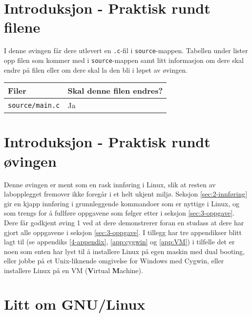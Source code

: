 \begin{alphasection}
\section{Introduksjon - Praktisk rundt filene}

I denne øvingen får dere utlevert en \verb|.c|-fil i \verb|source|-mappen. Tabellen under lister opp filen som kommer med i \verb|source|-mappen samt litt informasjon om dere skal endre på filen eller om dere skal la den bli i løpet av øvingen.

\begin{center}
 \begin{tabular}{|p{8.5cm} p{5.5cm}|} 
 \hline
 \textbf{Filer} & \textbf{Skal denne filen endres?}  \\ [0.5ex] 
 \hline\hline
  \verb|source/main.c| & Ja  \\ 
 \hline
\end{tabular}
\end{center}

\section{Introduksjon - Praktisk rundt øvingen}
Denne øvingen er ment som en rask innføring i Linux, slik  at resten av labopplegget fremover ikke foregår i et helt ukjent miljø. Seksjon \ref{sec:2-innføring} gir en kjapp innføring i grunnleggende kommandoer som er nyttige i Linux, og som trengs for å fullføre oppgavene som følger etter i seksjon \ref{sec:3-oppgave}. Dere får godkjent øving 1 ved at dere demonstrerer foran en studass at dere har gjort alle oppgavene i seksjon \ref{sec:3-oppgave}. 
I tillegg har tre appendikser blitt lagt til (se appendiks \ref{4-appendix}, \ref{app:cygwin} og \ref{app:VM}) i tilfelle det er noen som enten har lyst til å installere Linux på egen maskin med dual booting, eller jobbe på et Unix-liknende omgivelse for Windows med Cygwin, eller installere Linux på en VM (\textbf{V}irtual \textbf{M}achine).



\section{Litt om GNU/Linux}


\end{alphasection}
